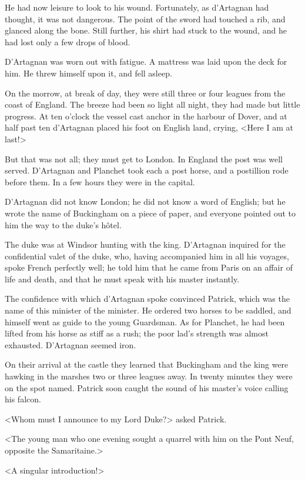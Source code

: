 He had now leisure to look to his wound. Fortunately, as d'Artagnan had thought, it was not dangerous. The point of the sword had touched a rib, and glanced along the bone. Still further, his shirt had stuck to the wound, and he had lost only a few drops of blood. 

D'Artagnan was worn out with fatigue. A mattress was laid upon the deck for him. He threw himself upon it, and fell asleep. 

On the morrow, at break of day, they were still three or four leagues from the coast of England. The breeze had been so light all night, they had made but little progress. At ten o'clock the vessel cast anchor in the harbour of Dover, and at half past ten d'Artagnan placed his foot on English land, crying, <Here I am at last!> 

But that was not all; they must get to London. In England the post was well served. D'Artagnan and Planchet took each a post horse, and a postillion rode before them. In a few hours they were in the capital. 

D'Artagnan did not know London; he did not know a word of English; but he wrote the name of Buckingham on a piece of paper, and everyone pointed out to him the way to the duke's hôtel. 

The duke was at Windsor hunting with the king. D'Artagnan inquired for the confidential valet of the duke, who, having accompanied him in all his voyages, spoke French perfectly well; he told him that he came from Paris on an affair of life and death, and that he must speak with his master instantly. 

The confidence with which d'Artagnan spoke convinced Patrick, which was the name of this minister of the minister. He ordered two horses to be saddled, and himself went as guide to the young Guardsman. As for Planchet, he had been lifted from his horse as stiff as a rush; the poor lad's strength was almost exhausted. D'Artagnan seemed iron. 

On their arrival at the castle they learned that Buckingham and the king were hawking in the marshes two or three leagues away. In twenty minutes they were on the spot named. Patrick soon caught the sound of his master's voice calling his falcon. 

<Whom must I announce to my Lord Duke?> asked Patrick. 

<The young man who one evening sought a quarrel with him on the Pont Neuf, opposite the Samaritaine.> 

<A singular introduction!> 

